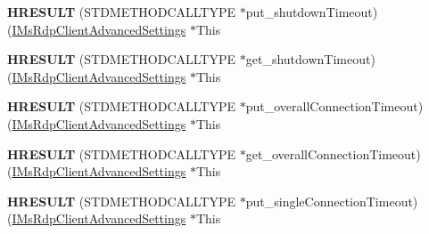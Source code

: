 \begin{DoxyCompactItemize}
\item 
\mbox{\label{struct_m_s_t_s_c_lib_1_1_i_ms_rdp_client_advanced_settings_vtbl_aa9e351b45f5a580d4757e23151bdc402}} 
{\bfseries H\+R\+E\+S\+U\+LT} (S\+T\+D\+M\+E\+T\+H\+O\+D\+C\+A\+L\+L\+T\+Y\+PE $\ast$put\+\_\+shutdown\+Timeout)(\hyperlink{interface_m_s_t_s_c_lib_1_1_i_ms_rdp_client_advanced_settings}{I\+Ms\+Rdp\+Client\+Advanced\+Settings} $\ast$This
\item 
\mbox{\label{struct_m_s_t_s_c_lib_1_1_i_ms_rdp_client_advanced_settings_vtbl_a27761e822d40ad6bd6c1ef03d78ade82}} 
{\bfseries H\+R\+E\+S\+U\+LT} (S\+T\+D\+M\+E\+T\+H\+O\+D\+C\+A\+L\+L\+T\+Y\+PE $\ast$get\+\_\+shutdown\+Timeout)(\hyperlink{interface_m_s_t_s_c_lib_1_1_i_ms_rdp_client_advanced_settings}{I\+Ms\+Rdp\+Client\+Advanced\+Settings} $\ast$This
\item 
\mbox{\label{struct_m_s_t_s_c_lib_1_1_i_ms_rdp_client_advanced_settings_vtbl_a6395bb438d356f07dbeabb0e1056756d}} 
{\bfseries H\+R\+E\+S\+U\+LT} (S\+T\+D\+M\+E\+T\+H\+O\+D\+C\+A\+L\+L\+T\+Y\+PE $\ast$put\+\_\+overall\+Connection\+Timeout)(\hyperlink{interface_m_s_t_s_c_lib_1_1_i_ms_rdp_client_advanced_settings}{I\+Ms\+Rdp\+Client\+Advanced\+Settings} $\ast$This
\item 
\mbox{\label{struct_m_s_t_s_c_lib_1_1_i_ms_rdp_client_advanced_settings_vtbl_a384309ab965fd8421c8d6f745b7d2c24}} 
{\bfseries H\+R\+E\+S\+U\+LT} (S\+T\+D\+M\+E\+T\+H\+O\+D\+C\+A\+L\+L\+T\+Y\+PE $\ast$get\+\_\+overall\+Connection\+Timeout)(\hyperlink{interface_m_s_t_s_c_lib_1_1_i_ms_rdp_client_advanced_settings}{I\+Ms\+Rdp\+Client\+Advanced\+Settings} $\ast$This
\item 
\mbox{\label{struct_m_s_t_s_c_lib_1_1_i_ms_rdp_client_advanced_settings_vtbl_a100d1cb13b8124344ca6734f9d370e33}} 
{\bfseries H\+R\+E\+S\+U\+LT} (S\+T\+D\+M\+E\+T\+H\+O\+D\+C\+A\+L\+L\+T\+Y\+PE $\ast$put\+\_\+single\+Connection\+Timeout)(\hyperlink{interface_m_s_t_s_c_lib_1_1_i_ms_rdp_client_advanced_settings}{I\+Ms\+Rdp\+Client\+Advanced\+Settings} $\ast$This
\item 

\end{DoxyCompactItemize}
